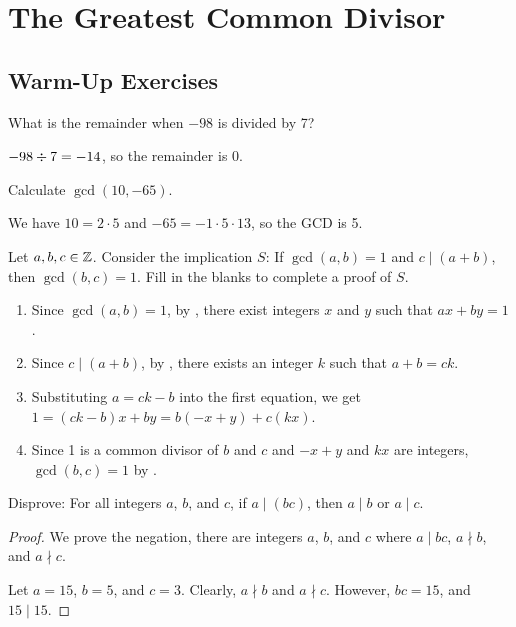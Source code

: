 \chapter{The Greatest Common Divisor}

\section{Warm-Up Exercises}

\begin{warmup}
  What is the remainder when $-98$ is divided by 7?
\end{warmup}
\begin{sol}
  $-98 \divisionsymbol 7 = -14$, so the remainder is 0.
\end{sol}

\begin{warmup}
  Calculate $\gcd(10,-65)$.
\end{warmup}
\begin{sol}
  We have $10 = 2 \cdot 5$ and $-65 = -1 \cdot 5 \cdot 13$, so the GCD is 5.
\end{sol}

\begin{warmup}
  Let $a,b,c\in\mathbb{Z}$. Consider the implication $S$:
  If $\gcd(a,b)=1$ and $c \mid (a+b)$, then $\gcd(b,c)=1$.
  Fill in the blanks to complete a proof of $S$.
\end{warmup}
\begin{enumerate}[nosep]
  \item Since $\gcd(a,b)=1$, by ,
        there exist integers $x$ and $y$ such that $ax+by=1$.
  \item Since $c \mid (a+b)$, by ,
        there exists an integer $k$ such that $a+b=ck$.
  \item Substituting $a=ck-b$ into the first equation, we get $1=(ck-b)x+by=b(-x+y)+c(kx)$.
  \item Since 1 is a common divisor of $b$ and $c$ and $-x+y$ and $kx$ are integers,
        $\gcd(b,c)=1$ by .
\end{enumerate}

\begin{warmup}
  Disprove: For all integers $a$, $b$, and $c$, if $a \mid (bc)$, then $a \mid b$ or $a \mid c$.
\end{warmup}
\begin{proof}
  We prove the negation, there are integers $a$, $b$, and $c$ where
  $a \mid bc$, $a \nmid b$, and $a \nmid c$.

  Let $a=15$, $b=5$, and $c=3$.
  Clearly, $a \nmid b$ and $a \nmid c$.
  However, $bc=15$, and $15 \mid 15$.
\end{proof}


